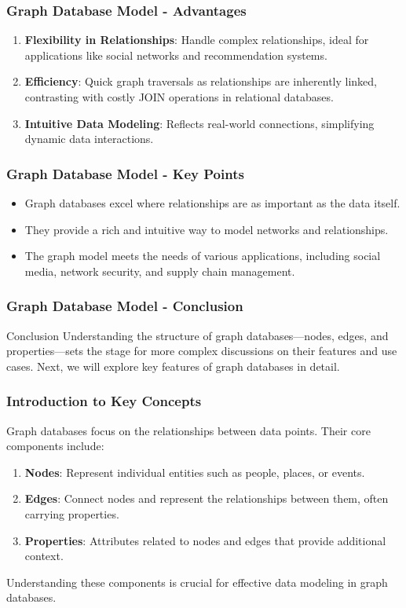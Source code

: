 \documentclass[aspectratio=169]{beamer}
\begin{document}
\begin{frame}[fragile]
    \frametitle{Graph Database Model - Advantages}
    \begin{enumerate}
        \item \textbf{Flexibility in Relationships}: Handle complex relationships, ideal for applications like social networks and recommendation systems.
        \item \textbf{Efficiency}: Quick graph traversals as relationships are inherently linked, contrasting with costly JOIN operations in relational databases.
        \item \textbf{Intuitive Data Modeling}: Reflects real-world connections, simplifying dynamic data interactions.
    \end{enumerate}
\end{frame}

\begin{frame}[fragile]
    \frametitle{Graph Database Model - Key Points}
    \begin{itemize}
        \item Graph databases excel where relationships are as important as the data itself.
        \item They provide a rich and intuitive way to model networks and relationships.
        \item The graph model meets the needs of various applications, including social media, network security, and supply chain management.
    \end{itemize}
\end{frame}

\begin{frame}[fragile]
    \frametitle{Graph Database Model - Conclusion}
    \begin{block}{Conclusion}
        Understanding the structure of graph databases—nodes, edges, and properties—sets the stage for more complex discussions on their features and use cases. 
        Next, we will explore key features of graph databases in detail.
    \end{block}
\end{frame}

\begin{frame}[fragile]
    \frametitle{Introduction to Key Concepts}
    Graph databases focus on the relationships between data points. Their core components include:
    \begin{enumerate}
        \item \textbf{Nodes}: Represent individual entities such as people, places, or events.
        \item \textbf{Edges}: Connect nodes and represent the relationships between them, often carrying properties.
        \item \textbf{Properties}: Attributes related to nodes and edges that provide additional context.
    \end{enumerate}
    
    Understanding these components is crucial for effective data modeling in graph databases.
\end{frame}
\end{document}
